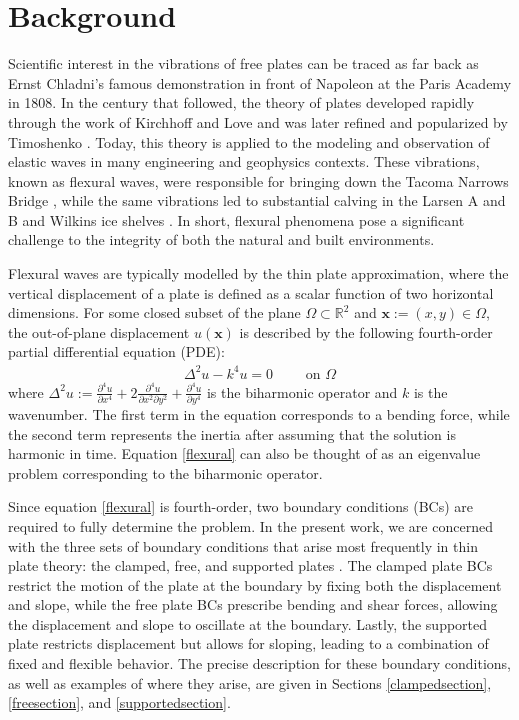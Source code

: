 \documentclass[preprint,12pt,3p]{elsarticle}
\begin{document}
\section{Background}

Scientific interest in the vibrations of free plates can be traced as far back as Ernst Chladni's famous demonstration in front of Napoleon at the Paris Academy in 1808. In the century that followed, the theory of plates developed rapidly through the work of Kirchhoff \cite{Kirchhoff1850} and Love \cite{love} and was later refined and popularized by Timoshenko \cite{timoshenko1959theory}. Today, this theory is applied to the modeling and observation of elastic waves in many engineering and geophysics contexts. These vibrations, known as flexural waves, were responsible for bringing down the Tacoma Narrows Bridge \cite{Drabek2003}, while the same vibrations led to substantial calving in the Larsen A and B and Wilkins ice shelves \cite{massom18}. In short, flexural phenomena pose a significant challenge to the integrity of both the natural and built environments. 

Flexural waves are typically modelled by the thin plate approximation, where the vertical displacement of a plate is defined as a scalar function of two horizontal dimensions. For some closed subset of the plane $\Omega \subset \mathbb{R}^2$ and $\mathbf{x}:=(x,y) \in \Omega$, the out-of-plane displacement $u(\mathbf{x})$ is described by the following fourth-order partial differential equation (PDE):
\begin{align}
    \Delta^2 u - k^4 u = 0 \qquad \text{ on } \Omega \label{flexural}
\end{align}
where $\Delta^2 u := \displaystyle \frac{\partial^4 u }{\partial x^4} + 2 \frac{\partial^4 u}{\partial x^2 \partial y^2} + \frac{\partial^4 u}{\partial y^4}$ is the biharmonic operator and $k$ is the wavenumber. The first term in the equation corresponds to a bending force, while the second term represents the inertia after assuming that the solution is harmonic in time. Equation \eqref{flexural} can also be thought of as an eigenvalue problem corresponding to the biharmonic operator.

Since equation \eqref{flexural} is fourth-order, two boundary conditions (BCs) are required to fully determine the problem. In the present work, we are concerned with the three sets of boundary conditions that arise most frequently in thin plate theory: the clamped, free, and supported plates \cite{timoshenko1959theory, ritz09, Friedrichs1928,kato1957estimation, landau59}. The clamped plate BCs restrict the motion of the plate at the boundary by fixing both the displacement and slope, while the free plate BCs prescribe bending and shear forces, allowing the displacement and slope to oscillate at the boundary. Lastly, the supported plate restricts displacement but allows for sloping, leading to a combination of fixed and flexible behavior. The precise description for these boundary conditions, as well as examples of where they arise, are given in Sections \ref{clampedsection}, \ref{freesection}, and \ref{supportedsection}. 
\end{document}

